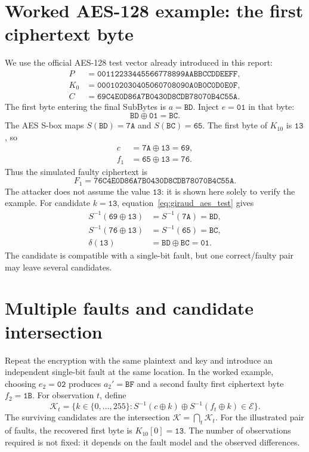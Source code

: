 \documentclass[11pt,a4paper]{report}
\newcommand{\hex}[1]{\texttt{#1}}
\newcommand{\xor}{\mathbin{\oplus}}
\begin{document}
\section{Worked AES-128 example: the first ciphertext byte}
We use the official AES-128 test vector already introduced in this report:
\begin{align*}
P&=\hex{00112233445566778899AABBCCDDEEFF},\\
K_0&=\hex{000102030405060708090A0B0C0D0E0F},\\
C&=\hex{69C4E0D86A7B0430D8CDB78070B4C55A}.
\end{align*}
The first byte entering the final SubBytes is $a=\hex{BD}$. Inject $e=\hex{01}$ in that byte:
\begin{equation}
\hex{BD}\xor\hex{01}=\hex{BC}.
\end{equation}
The AES S-box maps $S(\hex{BD})=\hex{7A}$ and $S(\hex{BC})=\hex{65}$. The first byte of $K_{10}$ is $\hex{13}$, so
\begin{align*}
c&=\hex{7A}\xor\hex{13}=\hex{69},\\
f_1&=\hex{65}\xor\hex{13}=\hex{76}.
\end{align*}
Thus the simulated faulty ciphertext is
\begin{equation}
F_1=\hex{76C4E0D86A7B0430D8CDB78070B4C55A}.
\end{equation}
The attacker does not assume the value $\hex{13}$: it is shown here solely to verify the example. For candidate $k=\hex{13}$, equation~\eqref{eq:giraud_aes_test} gives
\begin{align*}
S^{-1}(\hex{69}\xor\hex{13})&=S^{-1}(\hex{7A})=\hex{BD},\\
S^{-1}(\hex{76}\xor\hex{13})&=S^{-1}(\hex{65})=\hex{BC},\\
\delta(\hex{13})&=\hex{BD}\xor\hex{BC}=\boxed{\hex{01}}.
\end{align*}
The candidate is compatible with a single-bit fault, but one correct/faulty pair may leave several candidates.

\section{Multiple faults and candidate intersection}
Repeat the encryption with the same plaintext and key and introduce an independent single-bit fault at the same location. In the worked example, choosing $e_2=\hex{02}$ produces $a_2'=\hex{BF}$ and a second faulty first ciphertext byte $f_2=\hex{1B}$. For observation $t$, define
\begin{equation}
\mathcal K_t=\bigl\{k\in\{0,\ldots,255\}:S^{-1}(c\xor k)\xor S^{-1}(f_t\xor k)\in\mathcal E\bigr\}.
\end{equation}
The surviving candidates are the intersection $\mathcal K=\bigcap_t\mathcal K_t$. For the illustrated pair of faults, the recovered first byte is $K_{10}[0]=\hex{13}$. The number of observations required is not fixed: it depends on the fault model and the observed differences.
\end{document}
